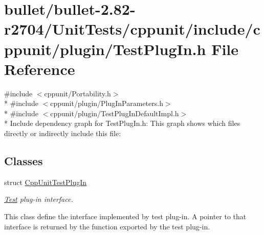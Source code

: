 \hypertarget{bullet_2bullet-2_882-r2704_2_unit_tests_2cppunit_2include_2cppunit_2plugin_2_test_plug_in_8h}{\section{bullet/bullet-\/2.82-\/r2704/\+Unit\+Tests/cppunit/include/cppunit/plugin/\+Test\+Plug\+In.h File Reference}
\label{bullet_2bullet-2_882-r2704_2_unit_tests_2cppunit_2include_2cppunit_2plugin_2_test_plug_in_8h}
}
{\ttfamily \#include $<$cppunit/\+Portability.\+h$>$}\\*
{\ttfamily \#include $<$cppunit/plugin/\+Plug\+In\+Parameters.\+h$>$}\\*
{\ttfamily \#include $<$cppunit/plugin/\+Test\+Plug\+In\+Default\+Impl.\+h$>$}\\*
Include dependency graph for Test\+Plug\+In.\+h\+:
This graph shows which files directly or indirectly include this file\+:
\subsection*{Classes}
\begin{DoxyCompactItemize}
\item 
struct \hyperlink{struct_cpp_unit_test_plug_in}{Cpp\+Unit\+Test\+Plug\+In}
\begin{DoxyCompactList}\small\item\em \hyperlink{class_test}{Test} plug-\/in interface.

This class define the interface implemented by test plug-\/in. A pointer to that interface is returned by the function exported by the test plug-\/in. \end{DoxyCompactList}\end{DoxyCompactItemize}
